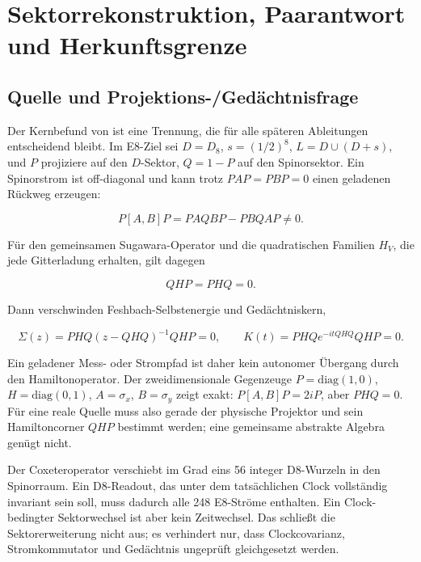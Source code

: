 

\chapter{Sektorrekonstruktion, Paarantwort und Herkunftsgrenze}
\section{Quelle und Projektions-/Gedächtnisfrage}

Der Kernbefund von  ist eine Trennung, die für
alle späteren Ableitungen entscheidend bleibt. Im E8-Ziel sei
\(D=D_8\), \(s=(1/2)^8\), \(L=D\cup(D+s)\), und \(P\) projiziere auf den
\(D\)-Sektor, \(Q=1-P\) auf den Spinorsektor. Ein Spinorstrom ist
off-diagonal und kann trotz \(PAP=PBP=0\) einen geladenen Rückweg erzeugen:

\[
 P[A,B]P=PAQBP-PBQAP\ne0.
\]

Für den gemeinsamen Sugawara-Operator und die quadratischen Familien \(H_V\),
die jede Gitterladung erhalten, gilt dagegen

\[
 QHP=PHQ=0.
\]

Dann verschwinden Feshbach-Selbstenergie und Gedächtniskern,

\[
 \Sigma(z)=PHQ(z-QHQ)^{-1}QHP=0,\qquad
 K(t)=PHQe^{-itQHQ}QHP=0.
\]

Ein geladener Mess- oder Strompfad ist daher kein autonomer Übergang durch
den Hamiltonoperator. Der zweidimensionale Gegenzeuge \(P=\mathrm{diag}(1,0)\),
\(H=\mathrm{diag}(0,1)\), \(A=\sigma_x\), \(B=\sigma_y\) zeigt exakt:
\(P[A,B]P=2iP\), aber \(PHQ=0\). Für eine reale Quelle muss also gerade der
physische Projektor und sein Hamiltoncorner \(QHP\) bestimmt werden; eine
gemeinsame abstrakte Algebra genügt nicht.

Der Coxeteroperator verschiebt im Grad eins 56 integer D8-Wurzeln in den
Spinorraum. Ein D8-Readout, das unter dem tatsächlichen Clock vollständig
invariant sein soll, muss dadurch alle 248 E8-Ströme enthalten. Ein Clock-
bedingter Sektorwechsel ist aber kein Zeitwechsel. Das schließt die
Sektorerweiterung nicht aus; es verhindert nur, dass Clockcovarianz,
Stromkommutator und Gedächtnis ungeprüft gleichgesetzt werden.

